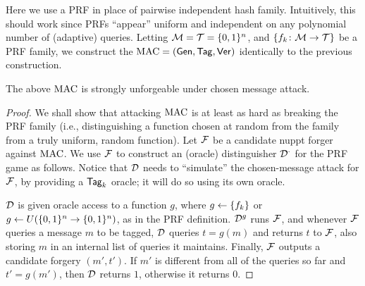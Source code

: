 \documentclass[11pt]{article}
\begin{document}
Here we use a PRF in place of pairwise independent hash family.
Intuitively, this should work since PRFs ``appear'' uniform and
independent on any polynomial number of (adaptive) queries.  Letting
$\mathcal{M} = \mathcal{T} = \{0,1\}^n$, and $\{f_k \colon \mathcal{M} \to
  \mathcal{T}\}$ be a PRF family, we construct the $\text{MAC} = (\mathsf{Gen},
\mathsf{Tag}, \mathsf{Ver})$ identically to the previous construction.

\begin{theorem} 
  The above $\text{MAC}$ is strongly unforgeable under chosen message
  attack.
\end{theorem}

\begin{proof}
  We shall show that attacking $\text{MAC}$ is at least as hard as breaking
  the PRF family (i.e., distinguishing a function chosen at random
  from the family from a truly uniform, random function).  Let $\mathcal{F}$
  be a candidate nuppt forger against $\text{MAC}$.  We use $\mathcal{F}$ to
  construct an (oracle) distinguisher $\mathcal{D}^{\cdot}$ for the PRF game
  as follows.  Notice that $\mathcal{D}$ needs to ``simulate'' the
  chosen-message attack for $\mathcal{F}$, by providing a $\mathsf{Tag}_{k}$
  oracle; it will do so using its own oracle.
  
  $\mathcal{D}$ is given oracle access to a function $g$, where $g \gets
  \{f_k\}$ or $g \gets U(\{0,1\}^n \to \{0,1\}^n)$, as in the PRF
  definition.  $\mathcal{D}^{g}$ runs $\mathcal{F}$, and whenever $\mathcal{F}$ queries a
  message $m$ to be tagged, $\mathcal{D}$ queries $t = g(m)$ and returns $t$
  to $\mathcal{F}$, also storing $m$ in an internal list of queries it
  maintains.  Finally, $\mathcal{F}$ outputs a candidate forgery $(m',t')$.
  If $m'$ is different from all of the queries so far and $t' =
  g(m')$, then $\mathcal{D}$ returns $1$, otherwise it returns $0$.


\end{proof}
\end{document}
